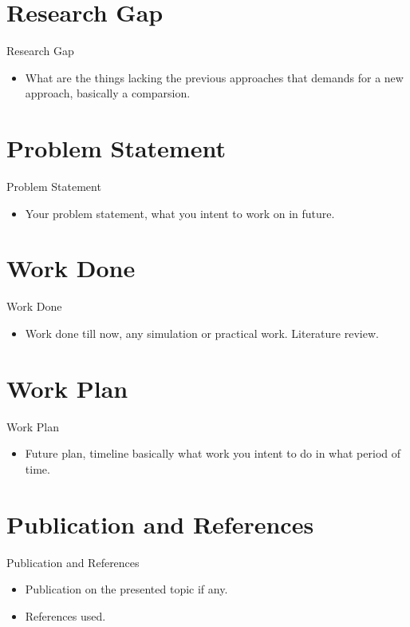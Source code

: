 \documentclass[dvipsnames,mathserif,aspectratio=169,10pt]{beamer}
\begin{document}
\section{Research Gap}
\begin{frame}{Research Gap}
    \begin{itemize}
        \item What are the things lacking the previous approaches that demands for a new approach, basically a comparsion.
    \end{itemize}
    \transfade[duration=0.2]
\end{frame}


\section{Problem Statement}
\begin{frame}{Problem Statement}
    \begin{itemize}
        \item Your problem statement, what you intent to work on in future.
    \end{itemize}
    \transfade[duration=0.2]
\end{frame}


\section{Work Done}
\begin{frame}{Work Done}
    \begin{itemize}
        \item Work done till now, any simulation or practical work. Literature review.
    \end{itemize}
    \transfade[duration=0.2]
\end{frame}


\section{Work Plan}
\begin{frame}{Work Plan}
    \begin{itemize}
        \item Future plan, timeline basically what work you intent to do in what period of time.
    \end{itemize}
    \transfade[duration=0.2]
\end{frame}


\section{Publication and References }
\begin{frame}{Publication and References}
    \begin{itemize}
        \item Publication on the presented topic if any.
        \item References used.
    \end{itemize}
\transfade[duration=0.2]
\end{frame}
\end{document}
